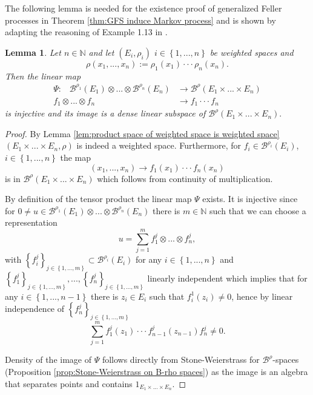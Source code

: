\documentclass[a4paper,12pt]{article}
\newtheorem{lemma}[theorem]{Lemma}
\theoremstyle{definition}
\theoremstyle{remark}
\numberwithin{equation}{section}
\numberwithin{theorem}{section}
\begin{document}
The following lemma is needed for the existence proof of generalized Feller processes in Theorem \ref{thm:GFS induce Markov process} and is shown by adapting the reasoning of Example 1.13 in \cite{KBi}.

\begin{lemma}
\label{lem:B-rho tensor product space, linear isomorphism}Let $n\in\mathbb{N}$ and let $\left(E_{i},\rho_{i}\right)$
$i\in\left\{ 1,...,n\right\} $ be weighted spaces and
\[
\rho\left(x_{1},...,x_{n}\right):=\rho_{1}\left(x_{1}\right)\cdot\cdot\cdot\rho_{n}\left(x_{n}\right).
\]
 Then the linear map 
\begin{align*}
\Psi:\,\,\,\,\,\mathcal{\mathscr{B}}^{\rho_{1}}(E_{1})\otimes...\otimes\mathcal{\mathscr{B}}^{\rho_{n}}(E_{n}) & \rightarrow\mathcal{\mathscr{B}}^{\rho}(E_{1}\times...\times E_{n})\\
f_{1}\otimes...\otimes f_{n} & \rightarrow f_{1}\cdot\cdot\cdot f_{n}
\end{align*}
is injective and its image is a dense linear subspace of $\mathcal{\mathscr{B}}^{\rho}(E_{1}\times...\times E_{n}).$
\end{lemma}
\begin{proof}
By Lemma \ref{lem:product space of weighted space is weighted space}
$
\left(E_{1}\times...\times E_{n},\rho\right)
$
 is indeed a weighted space. Furthermore, for $f_{i}\in\mathcal{\mathscr{B}}^{\rho_{i}}(E_{i})$,
$i\in\left\{ 1,...,n\right\} $ the map 
\[
\left(x_{1},...,x_{n}\right)\rightarrow f_{1}(x_{1})\cdot\cdot\cdot f_{n}(x_{n})
\]
is in $\mathcal{\mathscr{B}}^{\rho}(E_{1}\times...\times E_{n})$ which follows from continuity of multiplication.

By definition of the tensor product the linear map  $\Psi$  exists. It is injective since for
$
0\neq u\in\mathcal{\mathscr{B}}^{\rho_{1}}(E_{1})\otimes...\otimes\mathcal{\mathscr{B}}^{\rho_{n}}(E_{n})
$
 there is $m\in\mathbb{N}$ such that we can choose
a representation 
\[
u={\sum_{j=1}^{m}}f_{1}^{j}\otimes...\otimes f_{n}^{j},
\]
with $\left\{ f_{i}^{j}\right\} _{j\in\left\{ 1,...,m\right\} }\subset\mathcal{\mathscr{B}}^{\rho_{i}}(E_{i})$
for any $i\in\left\{ 1,...,n\right\} $ and 
$
\left\{ f_{1}^{j}\right\} _{j\in\left\{ 1,...,m\right\} },...,\left\{ f_{n}^{j}\right\} _{j\in\left\{ 1,...,m\right\} }
$
 linearly independent which implies that for
any $i\in\left\{ 1,...,n-1\right\} $ there is $z_{i}\in E_{i}$ such that $f_{i}^{1}(z_{i})\neq0$, hence by linear independence of $\left\{ f_{n}^{j}\right\} _{j\in\left\{ 1,...,m\right\} }$
\[
{\sum_{j=1}^{m}}f_{1}^{j}(z_{1})\cdot\cdot\cdot f_{n-1}^{j}(z_{n-1})f_{n}^{j}\neq0.
\]
 

Density of the image of $\Psi$ follows directly from Stone-Weierstrass
for $\mathcal{\mathscr{B}}^{\rho}$-spaces (Proposition \ref{prop:Stone-Weierstrass on B-rho spaces})
as the image is an algebra that separates points and contains
$1_{E_{1}\times...\times E_{n}}$.
\end{proof}
\end{document}
